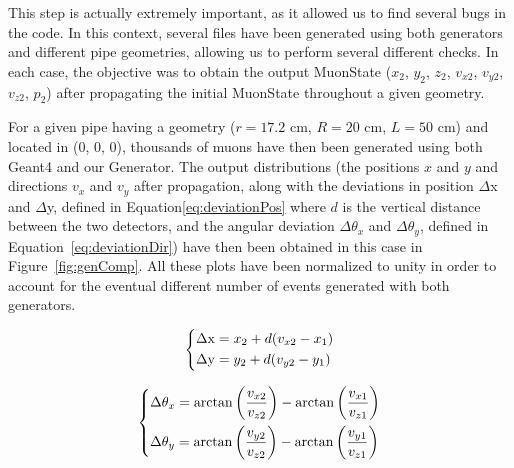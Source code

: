 \documentclass[a4paper, 11pt]{report}
\begin{document}
This step is actually extremely important, as it allowed us to find several bugs in the code. In this context, several files have been generated using both generators and different pipe geometries, allowing us to perform several different checks. In each case, the objective was to obtain the output MuonState ($x_2$, $y_2$, $z_2$, $v_{x2}$, $v_{y2}$, $v_{z2}$, $p_2$) after propagating the initial MuonState throughout a given geometry.

For a given pipe having a geometry ($r = 17.2$ cm, $R = 20$ cm, $L = 50$ cm) and located in (0, 0, 0), thousands of muons have then been generated using both Geant4 and our Generator. The output distributions (the positions $x$ and $y$ and directions $v_x$ and $v_y$ after propagation, along with the deviations in position $\Delta$x and $\Delta$y, defined in Equation\ref{eq:deviationPos} where $d$ is the vertical distance between the two detectors, and the angular deviation $\Delta \theta_x$ and $\Delta \theta_y$, defined in Equation~\ref{eq:deviationDir}) have then been obtained in this case in Figure~\ref{fig:genComp}. All these plots have been normalized to unity in order to account for the eventual different number of events generated with both generators.

\begin{equation}
\label{eq:deviationPos}
\begin{dcases}
\Delta \text{x} = x_2 + d (v_{x2} - x_1)  \\
\Delta \text{y} = y_2 + d (v_{y2} - y_1)
\end{dcases}
\end{equation}

\begin{equation}
\label{eq:deviationDir}
\begin{dcases}
\Delta \theta_x = \arctan \left ({\frac{v_{x2}}{v_{z2}}} \right ) - \arctan \left ({\frac{v_{x1}}{v_{z1}}} \right ) \\
\Delta \theta_y = \arctan \left ({\frac{v_{y2}}{v_{z2}}} \right ) - \arctan \left ({\frac{v_{y1}}{v_{z1}}} \right )
\end{dcases}
\end{equation}
\end{document}
